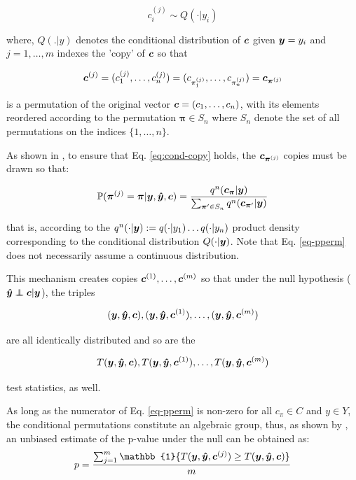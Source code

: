 \documentclass{article}
\begin{document}
\begin{equation}
    c_i^{(j)} \sim Q(\cdot|y_i)
     \label{eq:cond-copy}
\end{equation}

where, $Q(.|y)$ denotes the conditional distribution of $\boldsymbol{c}$ given $\boldsymbol{y}=y_i$ and $j=1,\dots, m$ indexes the 'copy' of $\boldsymbol{c}$ so that

$$ \boldsymbol{c}^{(j)} = (c_1^{(j)}, \dots, c_n^{(j)}) = (c_{\pi_1^{(j)}}, \dots, c_{\pi_n^{(j)}}) =  \boldsymbol{c}_{\boldsymbol{\pi}^{(j)}} $$

is a permutation of the original vector $\boldsymbol{c} = (c_1, \dots, c_n)$, with its elements reordered according to the permutation $ \boldsymbol{\pi} \in S_n$ where $S_n$ denote the set of all permutations on the indices $\{1,\dots,n\}$.

As shown in \citep{berrett2020conditional}, to ensure that Eq. \ref{eq:cond-copy} holds, the $\boldsymbol{c}_{\boldsymbol{\pi}^{(j)}}$ copies must be drawn so that:

\begin{equation}
    \label{eq-pperm}
    \mathbb{P}(\boldsymbol{ \pi }^{(j)} = \boldsymbol{ \pi } | \boldsymbol{y},\boldsymbol{\hat{y}},\boldsymbol{c}) = \frac{q^n(\boldsymbol{c}_{\boldsymbol{ \pi }} | \boldsymbol{y})}{\sum_{\boldsymbol{ \pi } ' \in S_n} q^n(\boldsymbol{c}_{\boldsymbol{ \pi } ' } | \boldsymbol{y})}
\end{equation}


that is, according to the $q^n(\cdot|\boldsymbol{y}) := q(\cdot | y_1) \dots q(\cdot|y_n)$ product density corresponding to the conditional distribution $Q(\cdot|\boldsymbol{y})$. Note that Eq. \ref{eq-pperm} does not necessarily assume a continuous distribution.

This mechanism creates copies $\boldsymbol{c}^{(1)}, \dots ,\boldsymbol{c}^{(m)}$ so that under the null hypothesis ($\yhat \independent \c | \y$), the triples 

$$(\boldsymbol{y},\boldsymbol{\hat{y}},\boldsymbol{c}), (\boldsymbol{y}, \boldsymbol{\hat{y}}, \boldsymbol{c}^{(1)}),\dots, (\boldsymbol{y}, \boldsymbol{\hat{y}}, \boldsymbol{c}^{(m)})$$

are all identically distributed and so are the 

$$T(\boldsymbol{y},\boldsymbol{\hat{y}},\boldsymbol{c}), T(\boldsymbol{y}, \boldsymbol{\hat{y}}, \boldsymbol{c}^{(1)}),\dots,T(\boldsymbol{y}, \boldsymbol{\hat{y}}, \boldsymbol{c}^{(m)})$$

test statistics, as well.

As long as the numerator of Eq. \ref{eq-pperm} is non-zero for all $c_\pi \in C$ and $y \in Y$, the conditional permutations constitute an algebraic group, thus, as shown by \citep{hemerik2018exact}, an unbiased estimate of the p-value under the null can be obtained as:
$$ p= \frac{\sum_{j=1}^m \mathbb{1} \{T(\y, \yhat, \c^{(j)}) \geq T(\y, \yhat, \c) \}  }{m}$$
\end{document}
